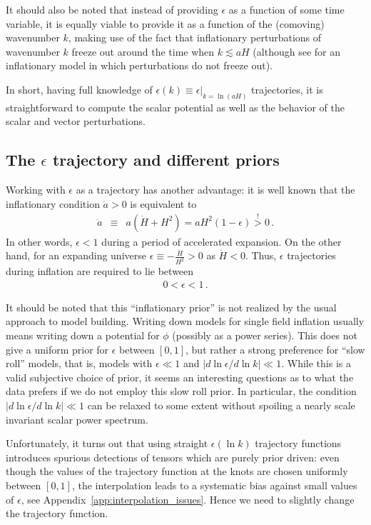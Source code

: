 \documentclass[a4paper,11pt]{article}
\begin{document}
It should also be noted that instead of providing $\epsilon$ as a
function of some time variable, it is equally viable to provide it as
a function of the (comoving) wavenumber $k$, making use of the fact
that inflationary perturbations of wavenumber $k$ freeze out around
the time when $k\lesssim aH$ (although see \cite{Vaudrevange:2009ag} for an
inflationary model in which perturbations do not freeze out).

In short, having full knowledge of
$\epsilon(k)\equiv \epsilon\vert_{k=\ln(aH)}$ trajectories, it is
straightforward to compute the scalar potential as well as the
behavior of the scalar and vector perturbations.

\subsection{The $\epsilon$ trajectory and different priors}

Working with $\epsilon$ as a trajectory has another advantage: it is
well known that the inflationary condition $\ddot a>0$ is equivalent
to
\begin{eqnarray}
  \ddot a&\equiv& a(\dot H+H^2)=aH^2(1-\epsilon)\stackrel{!}{>}0\,.
\end{eqnarray}
In other words, $\epsilon<1$ during a period of accelerated
expansion. On the other hand, for an expanding universe
$\epsilon\equiv-\frac{\dot{H}}{H^2}>0$ as $\dot H<0$. Thus, $\epsilon$
trajectories during inflation are required to lie between
\begin{eqnarray}
  0<\epsilon<1\,.
\end{eqnarray}

It should be noted that this ``inflationary prior'' is not realized by
the usual approach to model building. Writing down models for single
field inflation usually means writing down a potential for $\phi$
(possibly as a power series). This does not give a uniform prior for
$\epsilon$ between $[0,1]$, but rather a strong preference for ``slow
roll'' models, that is, models with $\epsilon\ll1$ and $\vert
d\ln\epsilon/d\ln k\vert\ll 1$. While this is a valid subjective
choice of prior, it seems an interesting questions as to what the data
prefers if we do not employ this slow roll prior. In particular, the
condition $\vert d\ln\epsilon/d\ln k\vert\ll 1$ can be relaxed to some
extent without spoiling a nearly scale invariant scalar power
spectrum.

Unfortunately, it turns out that using straight $\epsilon(\ln k)$
trajectory functions introduces spurious detections of tensors which
are purely prior driven: even though the values of the trajectory
function at the knots are chosen uniformly between $[0,1]$, the
interpolation leads to a systematic bias against small values of
$\epsilon$, see Appendix~\ref{app:interpolation_issues}. Hence we need
to slightly change the trajectory function.
\end{document}
